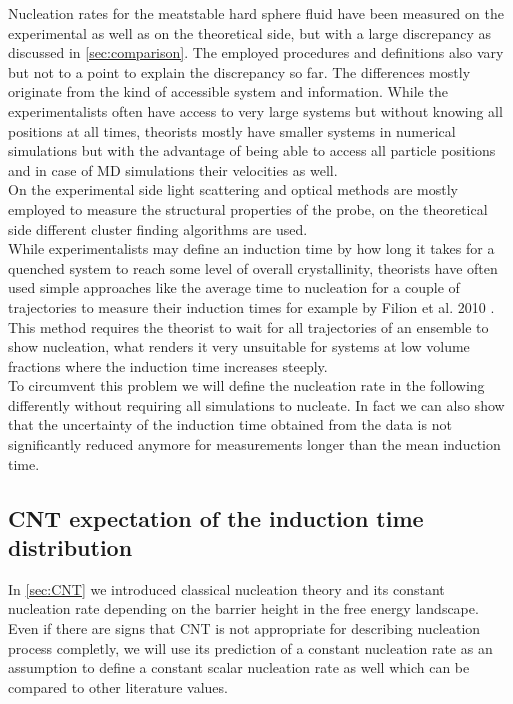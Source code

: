 Nucleation rates for the meatstable hard sphere fluid have been measured on the experimental as well as on the theoretical side, but with a large discrepancy as discussed in \autoref{sec:comparison}. The employed procedures and definitions also vary but not to a point to explain the discrepancy so far. The differences mostly originate from the kind of accessible system and information. While the experimentalists often have access to very large systems but without knowing all positions at all times, theorists mostly have smaller systems in numerical simulations but with the advantage of being able to access all particle positions and in case of MD simulations their velocities as well.\\
On the experimental side light scattering and optical methods are mostly employed to measure the structural properties of the probe, on the theoretical side different cluster finding algorithms are used.\\
While experimentalists may define an induction time by how long it takes for a quenched system to reach some level of overall crystallinity, theorists have often used simple approaches like the average time to nucleation for a couple of trajectories to measure their induction times for example by Filion et al. 2010\cite{Filion2010a} . This method requires the theorist to wait for all trajectories of an ensemble to show nucleation, what renders it very unsuitable for systems at low volume fractions where the induction time increases steeply.\\

To circumvent this problem we will define the nucleation rate in the following differently without requiring all simulations to nucleate. In fact we can also show that the uncertainty of the induction time obtained from the data is not significantly reduced anymore for measurements longer than the mean induction time.

\subsection{CNT expectation of the induction time distribution}
\label{sec:induction_time_expectation}
In \autoref{sec:CNT} we introduced classical nucleation theory and its constant nucleation rate depending on the barrier height in the free energy landscape. Even if there are signs that CNT is not appropriate for describing nucleation process completly, we will use its prediction of a constant nucleation rate as an assumption to define a constant scalar nucleation rate as well which can be compared to other literature values.\\

